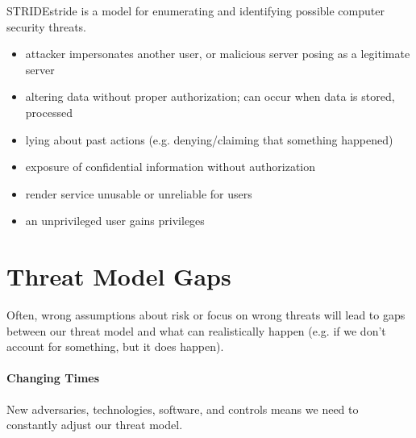 \documentclass[code]{amznotes}
\begin{document}
\begin{dfnbox}{STRIDE}{stride}
     is a model for enumerating and identifying possible computer security threats.
    \begin{itemize}[noitemsep]
        \item {} attacker impersonates another user, or malicious server posing as a legitimate server
        \item {} altering data without proper authorization; can occur when data is stored, processed
        \item {} lying about past actions (e.g. denying/claiming that something happened)
        \item {} exposure of confidential information without authorization
        \item {} render service unusable or unreliable for users
        \item {} an unprivileged user gains privileges
    \end{itemize}
\end{dfnbox}

\section{Threat Model Gaps}
Often, wrong assumptions about risk or focus on wrong threats will lead to gaps between our threat model and what can realistically happen (e.g. if we don't account for something, but it does happen).

\paragraph{Changing Times}
New adversaries, technologies, software, and controls means we need to constantly adjust our threat model.
\end{document}
